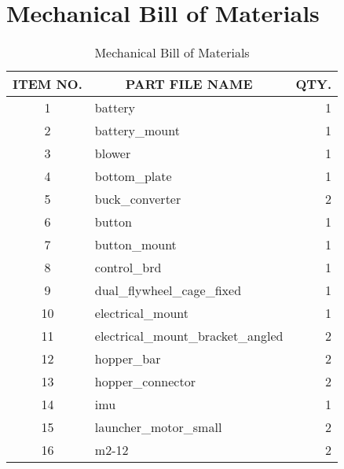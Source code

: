 \chapter{Mechanical Bill of Materials}
\label{appendix:mech_bom}

\begin{longtable}{clr}
	\caption{Mechanical Bill of Materials}
	\label{tab:mech_bom}
	\endfirsthead
	\endhead
	\hline
			ITEM NO. & \multicolumn{1}{c}{PART FILE NAME}      & \multicolumn{1}{c}{QTY.} \\ \hline
	1        & battery                                 & 1                        \\ \hline
	2        & battery\_mount                          & 1                        \\ \hline
	3        & blower                                  & 1                        \\ \hline
	4        & bottom\_plate                           & 1                        \\ \hline
	5        & buck\_converter                         & 2                        \\ \hline
	6        & button                                  & 1                        \\ \hline
	7        & button\_mount                           & 1                        \\ \hline
	8        & control\_brd                            & 1                        \\ \hline
	9        & dual\_flywheel\_cage\_fixed             & 1                        \\ \hline
	10       & electrical\_mount                       & 1                        \\ \hline
	11       & electrical\_mount\_bracket\_angled      & 2                        \\ \hline
	12       & hopper\_bar                             & 2                        \\ \hline
	13       & hopper\_connector                       & 2                        \\ \hline
	14       & imu                                     & 1                        \\ \hline
	15       & launcher\_motor\_small                  & 2                        \\ \hline
	16       & m2-12                                   & 2                        \\ \hline

\end{longtable}
